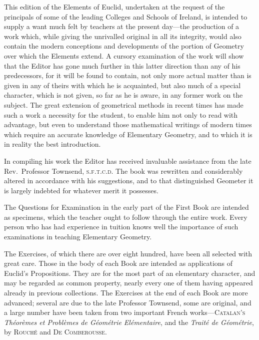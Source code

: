 \documentclass[oneside]{book}
\begin{document}
\noindent This edition of the Elements of Euclid, undertaken
at the request of the principals of some of
the leading Colleges and Schools of Ireland, is
intended to supply a want much felt by teachers
at the present day---the production of a work
which, while giving the unrivalled original in
all its integrity, would also contain the modern
conceptions and developments of the portion of
Geometry over which the Elements extend. A
cursory examination of the work will show that
the Editor has gone much further in this latter
direction than any of his predecessors, for it will
be found to contain, not only more actual matter
than is given in any of theirs with which he is
acquainted, but also much of a special character,
which is not given, so far as he is aware, in any
former work on the subject. The great extension
of geometrical methods in recent times has made
such a work a necessity for the student, to enable
him not only to read with advantage, but even to
understand those mathematical writings of modern
times which require an accurate knowledge
of Elementary Geometry, and to which it is in
reality the best introduction.

In compiling his work the Editor has received
invaluable assistance from the late Rev.\ Professor
Townsend, \textsc{s.f.t.c.d.} The book was rewritten
and considerably altered in accordance with his
suggestions, and to that distinguished Geometer
it is largely indebted for whatever merit it possesses.

The Questions for Examination in the early part
of the First Book are intended as specimens,
which the teacher ought to follow through the
entire work. Every person who has had experience
in tuition knows well the importance
of such examinations in teaching Elementary
Geometry.

The Exercises, of which there are over eight
hundred, have been all selected with great care.
Those in the body of each Book are intended as
applications of Euclid's Propositions. They are
for the most part of an elementary character, and
may be regarded as common property, nearly
every one of them having appeared already in
previous collections. The Exercises at the end
of each Book are more advanced; several are
due to the late Professor Townsend, some are
original, and a large number have been taken
from two important French works---\textsc{Catalan's}
\textit{Théorèmes et Problèmes de Géométrie Elémentaire},
and the \textit{Traité de Géométrie}, by \textsc{Rouché} and
\textsc{De Comberousse}.
\end{document}
